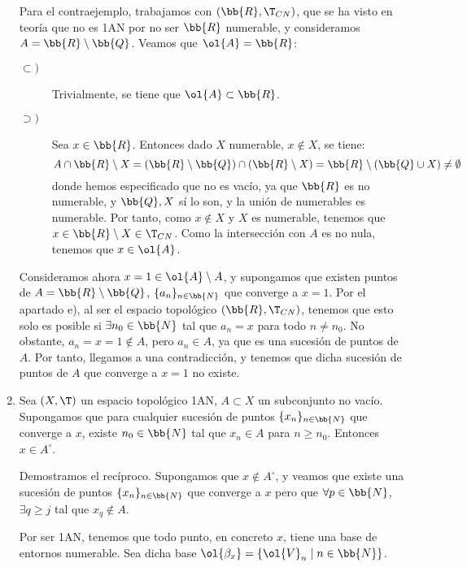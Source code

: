 \begin{ejercicio}
\begin{enumerate}[label=\alph*)]
        Para el contraejemplo, trabajamos con $(\bb{R},\T_{CN})$, que se ha visto en teoría que no es 1AN por no ser $\bb{R}$ numerable, y consideramos $A=\bb{R}\setminus \bb{Q}$. Veamos que $\ol{A} = \bb{R}$:
        \begin{description}
            \item[$\subset)$] Trivialmente, se tiene que $\ol{A}\subset \bb{R}$.
            \item[$\supset)$] Sea $x\in \bb{R}$. Entonces dado $X$ numerable, $x\notin X$, se tiene:
            \begin{equation*}
                A\cap \bb{R}\setminus X = (\bb{R}\setminus \bb{Q})\cap (\bb{R}\setminus X)
                = \bb{R}\setminus (\bb{Q}\cup X) \neq \emptyset
            \end{equation*}
            donde hemos especificado que no es vacío, ya que $\bb{R}$ es no numerable, y $\bb{Q},X$ sí lo son, y la unión de numerables es numerable. Por tanto, como $x\notin X$ y $X$ es numerable, tenemos que $x\in \bb{R}\setminus X\in \T_{CN}$. Como la intersección con $A$ es no nula, tenemos que $x\in \ol{A}$.
        \end{description}
        
        Consideramos ahora $x=1\in \ol{A}\setminus A$, y supongamos que existen puntos de $A=\bb{R}\setminus \bb{Q}$, $\{a_n\}_{n\in \bb{N}}$ que converge a $x=1$. Por el apartado e), al ser el espacio topológico $(\bb{R},\T_{CN})$, tenemos que esto solo es posible si $\exists n_0\in \bb{N}$ tal que $a_n=x$ para todo $n\neq n_0$. No obstante, $a_n=x=1\notin A$, pero $a_n\in A$, ya que es una sucesión de puntos de $A$. Por tanto, llegamos a una contradicción, y tenemos que dicha sucesión de puntos de $A$ que converge a $x=1$ no existe.

        \item Sea $(X,\T)$ un espacio topológico 1AN, $A\subset X$ un subconjunto no vacío. Supongamos que para cualquier sucesión de puntos $\{x_n\}_{n\in \bb{N}}$ que converge a $x$, existe $n_0\in \bb{N}$ tal que $x_n\in A$ para $n\geq n_0$. Entonces $x\in A^\circ$.

        Demostramos el recíproco. Supongamos que $x\notin A^\circ$, y veamos que existe una sucesión de puntos $\{x_n\}_{n\in \bb{N}}$ que converge a $x$ pero que $\forall p\in \bb{N}$, $\exists q\geq j$ tal que $x_q\notin A$.

        Por ser 1AN, tenemos que todo punto, en concreto $x$, tiene una base de entornos numerable. Sea dicha base $\ol{\beta_x}=\{\ol{V}_n\mid n\in \bb{N}\}$.


\end{enumerate}
\end{ejercicio}
